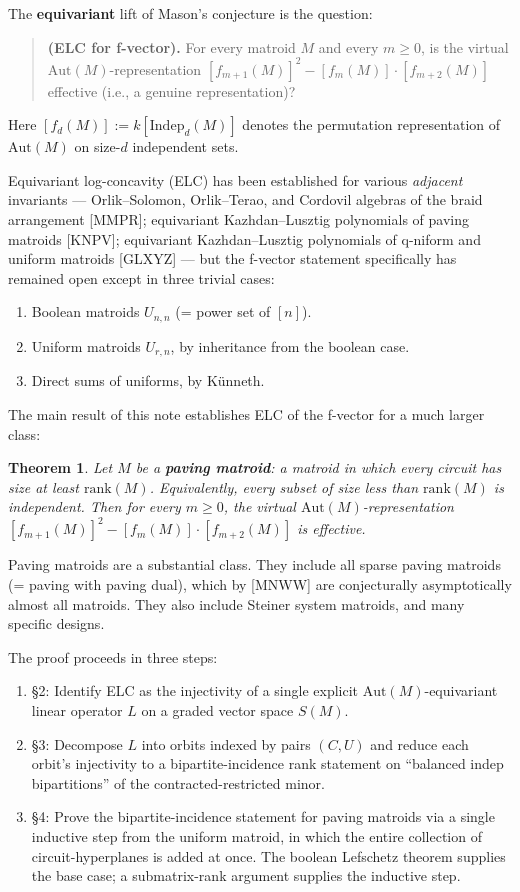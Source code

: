 \documentclass[11pt]{article}
\newtheorem{theorem}{Theorem}
\theoremstyle{definition}
\newcommand{\Indep}{\mathrm{Indep}}
\newcommand{\Aut}{\mathrm{Aut}}
\newcommand{\rank}{\mathrm{rank}}
\begin{document}
The \textbf{equivariant} lift of Mason's conjecture is the question:

\begin{quote}
\textbf{(ELC for f-vector).} For every matroid $M$ and every $m \geq 0$, is the virtual $\Aut(M)$-representation $[f_{m+1}(M)]^2 - [f_m(M)] \cdot [f_{m+2}(M)]$ effective (i.e., a genuine representation)?
\end{quote}

Here $[f_d(M)] := k[\Indep_d(M)]$ denotes the permutation representation of $\Aut(M)$ on size-$d$ independent sets.

Equivariant log-concavity (ELC) has been established for various \emph{adjacent} invariants --- Orlik--Solomon, Orlik--Terao, and Cordovil algebras of the braid arrangement [MMPR]; equivariant Kazhdan--Lusztig polynomials of paving matroids [KNPV]; equivariant Kazhdan--Lusztig polynomials of q-niform and uniform matroids [GLXYZ] --- but the f-vector statement specifically has remained open except in three trivial cases:

\begin{enumerate}[leftmargin=*]
\item Boolean matroids $U_{n,n}$ (= power set of $[n]$).
\item Uniform matroids $U_{r,n}$, by inheritance from the boolean case.
\item Direct sums of uniforms, by K\"unneth.
\end{enumerate}

The main result of this note establishes ELC of the f-vector for a much larger class:

\begin{theorem}
Let $M$ be a \textbf{paving matroid}: a matroid in which every circuit has size at least $\rank(M)$. Equivalently, every subset of size less than $\rank(M)$ is independent. Then for every $m \geq 0$, the virtual $\Aut(M)$-representation $[f_{m+1}(M)]^2 - [f_m(M)] \cdot [f_{m+2}(M)]$ is effective.
\end{theorem}

Paving matroids are a substantial class. They include all sparse paving matroids (= paving with paving dual), which by [MNWW] are conjecturally asymptotically almost all matroids. They also include Steiner system matroids, and many specific designs.

The proof proceeds in three steps:
\begin{enumerate}[leftmargin=*]
\item \S2: Identify ELC as the injectivity of a single explicit $\Aut(M)$-equivariant linear operator $L$ on a graded vector space $S(M)$.
\item \S3: Decompose $L$ into orbits indexed by pairs $(C, U)$ and reduce each orbit's injectivity to a bipartite-incidence rank statement on ``balanced indep bipartitions'' of the contracted-restricted minor.
\item \S4: Prove the bipartite-incidence statement for paving matroids via a single inductive step from the uniform matroid, in which the entire collection of circuit-hyperplanes is added at once. The boolean Lefschetz theorem supplies the base case; a submatrix-rank argument supplies the inductive step.
\end{enumerate}
\end{document}
